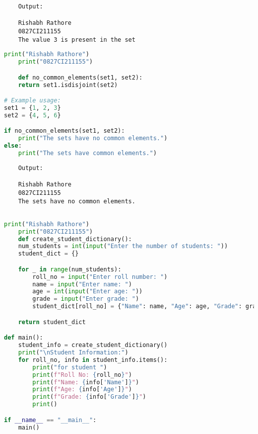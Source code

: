 \documentclass{report}
\begin{document}
\begin{verbatim}
	Output:

	Rishabh Rathore
	0827CI211155
	The value 3 is present in the set

\end{verbatim}

\newpage


\sol 
\begin{lstlisting}[language=Python]
	print("Rishabh Rathore")
	print("0827CI211155")

	def no_common_elements(set1, set2):
    return set1.isdisjoint(set2)

# Example usage:
set1 = {1, 2, 3}
set2 = {4, 5, 6}

if no_common_elements(set1, set2):
    print("The sets have no common elements.")
else:
    print("The sets have common elements.")

\end{lstlisting}

\begin{verbatim}
	Output:

	Rishabh Rathore
	0827CI211155
	The sets have no common elements.


\end{verbatim}

\newpage


\sol 
\begin{lstlisting}[language=Python]
	print("Rishabh Rathore")
	print("0827CI211155")
	def create_student_dictionary():
    num_students = int(input("Enter the number of students: "))
    student_dict = {}

    for _ in range(num_students):
        roll_no = input("Enter roll number: ")
        name = input("Enter name: ")
        age = int(input("Enter age: "))
        grade = input("Enter grade: ")
        student_dict[roll_no] = {"Name": name, "Age": age, "Grade": grade}

    return student_dict

def main():
    student_info = create_student_dictionary()
    print("\nStudent Information:")
    for roll_no, info in student_info.items():
        print("for student ")
        print(f"Roll No: {roll_no}")
        print(f"Name: {info['Name']}")
        print(f"Age: {info['Age']}")
        print(f"Grade: {info['Grade']}")
        print()

if __name__ == "__main__":
    main()
  

\end{lstlisting}
\end{document}
